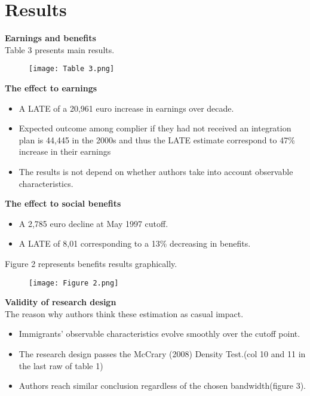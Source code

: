 \documentclass[../root]{subfiles}
\begin{document}
    \section{Results}
    {\bf Earnings and benefits}　\\
    Table 3 presents main results.
    
    \begin{figure}[h]
        \texttt{[image: Table 3.png]}
    \end{figure}
    
    
    {\bf The effect to earnings } \\
    \begin{itemize}
        \item A LATE of a 20,961 euro  increase in earnings over decade.
        \item Expected outcome among complier if they had not received an integration plan is 44,445 in the 2000s and thus the LATE estimate correspond to 47\% increase in their earnings
        \item The results is not depend on whether authors take into account observable characteristics.  
    \end{itemize}
    
    
    {\bf The effect to social benefits}
    \begin{itemize}
        \item A 2,785 euro decline at May 1997 cutoff.
        \item A LATE of 8,01 corresponding to a 13\% decreasing in benefits.
    \end{itemize}
    Figure 2 represents benefits results graphically.
    
    \begin{figure}[h]
        \texttt{[image: Figure 2.png]}
    \end{figure}
    
    {\bf Validity of research design} \\
    The reason why authors think these estimation as casual impact.
    \begin{itemize}
        \item Immigrants' observable characteristics evolve smoothly over the cutoff point.
        \item The research design passes the McCrary (2008) Density Test.(col 10 and 11 in the last raw of table 1)
        \item Authors reach similar conclusion regardless of the chosen bandwidth(figure 3).
    \end{itemize}
    
\end{document}
